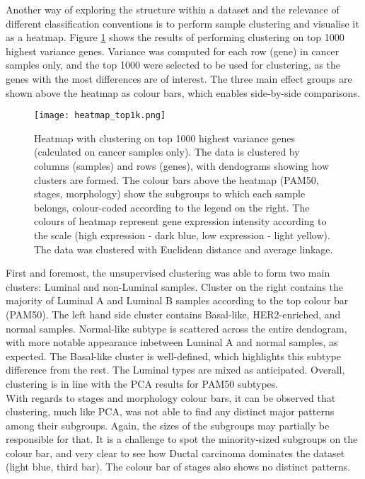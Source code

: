         
        
    \newpage  
    
    Another way of exploring the structure within a dataset and the relevance of different classification conventions is to perform sample clustering and visualise it as a heatmap. Figure \ref{fig:heatmap1k} shows the results of performing clustering on top 1000 highest variance genes. Variance was computed for each row (gene) in cancer samples only, and the top 1000 were selected to be used for clustering, as the genes with the most differences are of interest. The three main effect groups are shown above the heatmap as colour bars, which enables side-by-side comparisons.     
    
            \begin{figure}[!h]
            \centering
            \texttt{[image: heatmap\_top1k.png]}
            \caption{Heatmap with clustering on top 1000 highest variance genes (calculated on cancer samples only). The data is clustered by columns (samples) and rows (genes), with dendograms showing how clusters are formed. The colour bars above the heatmap (PAM50, stages, morphology) show the subgroups to which each sample belongs, colour-coded according to the legend on the right. The colours of heatmap represent gene expression intensity according to the scale (high expression - dark blue, low expression - light yellow). The data was clustered with Euclidean distance and average linkage. }
            \label{fig:heatmap1k}
            \end{figure}
    
    First and foremost, the unsupervised clustering was able to form two main clusters: Luminal and non-Luminal samples. Cluster on the right contains the majority of Luminal A and Luminal B samples according to the top colour bar (PAM50). The left hand side cluster contains Basal-like, HER2-enriched, and normal samples. Normal-like subtype is scattered across the entire dendogram, with more notable appearance inbetween Luminal A and normal samples, as expected. The Basal-like cluster is well-defined, which highlights this subtype difference from the rest. The Luminal types are mixed as anticipated. Overall, clustering is in line with the PCA results for PAM50 subtypes. \\
    With regards to stages and morphology colour bars, it can be observed that clustering, much like PCA, was not able to find any distinct major patterns among their subgroups. Again, the sizes of the subgroups may partially be responsible for that. It is a challenge to spot the minority-sized subgroups on the colour bar, and very clear to see how Ductal carcinoma dominates the dataset (light blue, third bar). The colour bar of stages also shows no distinct patterns. 
    
